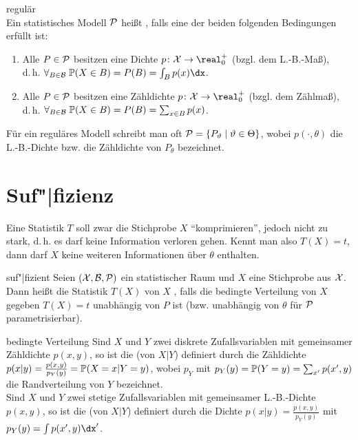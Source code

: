 \begin{Def}{regulär}\\
    Ein statistisches Modell $\P$ heißt , falls eine der beiden folgenden
    Bedingungen erfüllt ist:
    \begin{enumerate}
        \item
        Alle $P \in \P$ besitzen eine Dichte $p\colon \X \rightarrow \real_0^+$
        (bzgl. dem L.-B.-Maß),\\
        d.\,h. $\forall_{B \in \B}\; \PP(X \in B) = P(B) = \int_B p(x)\dx$.

        \item
        Alle $P \in \P$ besitzen eine Zähldichte $p\colon \X \rightarrow \real_0^+$
        (bzgl. dem Zählmaß),\\
        d.\,h. $\forall_{B \in \B}\; \PP(X \in B) = P(B) = \sum_{x \in B} p(x)$.
    \end{enumerate}
    Für ein reguläres Modell schreibt man oft $\P = \{P_\theta \;|\; \theta \in \Theta\}$,
    wobei $p(\cdot, \theta)$ die L.-B.-Dichte bzw. die Zähldichte von $P_\theta$ bezeichnet.
\end{Def}

\pagebreak

\section{%
    Suf"|fizienz%
}

\begin{Bem}
    Eine Statistik $T$ soll zwar die Stichprobe $X$ "`komprimieren"', jedoch nicht zu stark,
    d.\,h. es darf keine Information verloren gehen.
    Kennt man also $T(X) = t$, dann darf $X$ keine weiteren Informationen über $\theta$ enthalten.
\end{Bem}

\begin{Def}{suf"|fizient}
    Seien $(\X, \B, \P)$ ein statistischer Raum und $X$ eine Stichprobe aus $\X$.\\
    Dann heißt die Statistik $T(X)$ von $X$ , falls
    die bedingte Verteilung von $X$ gegeben $T(X) = t$ unabhängig von $P$ ist
    (bzw. unabhängig von $\theta$ für $\P$ parametrisierbar).
\end{Def}

\begin{Def}{bedingte Verteilung}
    Sind $X$ und $Y$ zwei diskrete Zufallsvariablen mit gemeinsamer Zähldichte $p(x, y)$,
    so ist die  (von $X|Y$) definiert durch
    die Zähldichte $p(x|y) = \frac{p(x, y)}{p_Y(y)} = \PP(X = x|Y = y)$,
    wobei $p_Y$ mit $p_Y(y) = \PP(Y = y) = \sum_{x'} p(x', y)$ die Randverteilung von $Y$
    bezeichnet.\\
    Sind $X$ und $Y$ zwei stetige Zufallsvariablen mit gemeinsamer L.-B.-Dichte $p(x, y)$,
    so ist die  (von $X|Y$) definiert durch
    die Dichte $p(x|y) = \frac{p(x, y)}{p_Y(y)}$ mit $p_Y(y) = \int p(x', y)\dx'$.
\end{Def}

